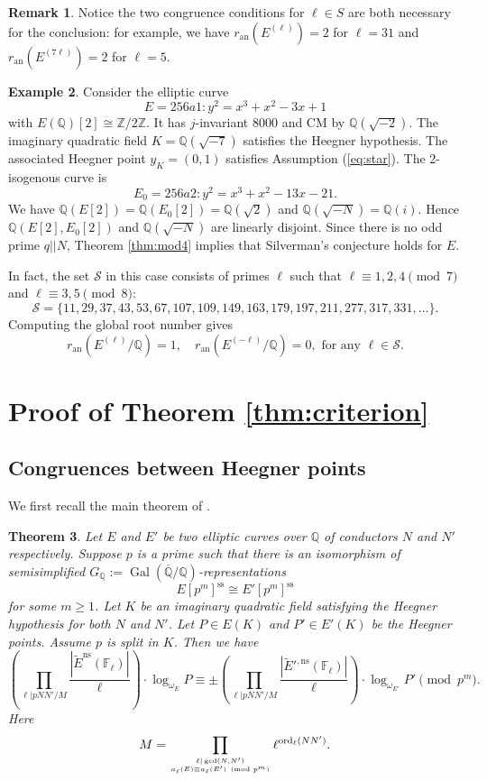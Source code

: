 \documentclass[11pt]{amsart}
\newtheorem{theorem}{Theorem}[section]
\theoremstyle{definition}
\newtheorem{remark}[theorem]{Remark}
\newtheorem{example}[theorem]{Example}
\DeclareMathOperator{\ord}{ord}
\DeclareMathOperator{\Gal}{Gal}
\begin{document}
\begin{remark}
  Notice the two congruence conditions for $\ell\in S$ are both necessary for the conclusion: for example, we have $r_\mathrm{an}(E^{(\ell)})=2$ for $\ell=31$ and $r_\mathrm{an}(E^{(7 \ell)})=2$ for $\ell=5$.
\end{remark}

\begin{example}
  Consider the elliptic curve $$E=256a1: y^2=x^3+x^2-3x+1$$ with $E(\mathbb{Q})[2]\cong \mathbb{Z}/2 \mathbb{Z}$. It has $j$-invariant 8000 and CM by $\mathbb{Q}(\sqrt{-2})$. The imaginary quadratic field $K=\mathbb{Q} (\sqrt{-7})$ satisfies the Heegner hypothesis. The associated Heegner point $y_K=(0,1)$ satisfies Assumption (\ref{eq:star}). The 2-isogenous curve is $$E_0=256a2: y^2=x^3+x^2-13x-21.$$ We have $\mathbb{Q}(E[2])=\mathbb{Q}(E_0[2])=\mathbb{Q}(\sqrt{2})$ and $\mathbb{Q}(\sqrt{-N})=\mathbb{Q}(i)$. Hence $\mathbb{Q}(E[2], E_0[2])$ and $\mathbb{Q}(\sqrt{-N})$ are linearly disjoint. Since there is no odd prime $q||N$, Theorem \ref{thm:mod4} implies that Silverman's conjecture holds for $E$.


  In fact, the set $\mathcal{S}$ in this case consists of primes $\ell$ such that $\ell\equiv1,2,4\pmod{7}$ and $\ell\equiv3,5\pmod{8}$: $$\mathcal{S}=\{11,
 29,
 37,
 43,
 53,
 67,
 107,
 109,
 149,
 163,
 179,
 197,
 211,
 277,
 317,
 331,\ldots\}.$$ Computing the global root number gives $$r_\mathrm{an}(E^{(\ell)}/\mathbb{Q})=1, \quad r_\mathrm{an}(E^{(-\ell)}/\mathbb{Q})=0,\text{ for any }\ell\in \mathcal{S}.$$
\end{example}

\section{Proof of Theorem \ref{thm:criterion}}


\subsection{Congruences between Heegner points}\label{sec:congr-betw-heegn} We first recall the main theorem of \cite{KrizLi2016a}. 
\begin{theorem}\label{thm:maincongruence} Let $E$ and $E'$ be two elliptic curves over $\mathbb{Q}$ of conductors $N$ and $N'$ respectively. Suppose $p$ is a prime such that there is an isomorphism of semisimplified  $G_\mathbb{Q}:=\Gal(\overline{\mathbb{Q}}/\mathbb{Q})$-representations $$E[p^m]^{\mathrm{ss}} \cong E'[p^m]^{\mathrm{ss}}$$ for some $m\ge1$. Let $K$ be an imaginary quadratic field satisfying the Heegner hypothesis for both $N$ and $N'$. Let $P \in E(K)$ and $P' \in E'(K)$ be the Heegner points. Assume $p$ is split in $K$. Then we have
$$\left(\prod_{\ell|pNN'/M}\frac{|\tilde{E}^{\mathrm{ns}}(\mathbb{F}_{\ell})|}{\ell}\right)\cdot \log_{\omega_E}P \equiv \pm\left(\prod_{\ell|pNN'/M}\frac{|\tilde{E}'^{,\mathrm{ns}}(\mathbb{F}_{\ell})|}{\ell}\right)\cdot\log_{\omega_{E'}}P' \pmod {p^m}.$$ Here 
$$M = \prod_{\ell|\gcd(N,N') \atop a_{\ell}(E)\equiv a_{\ell}(E')\pmod{p^m}}\ell^{\ord_{\ell}(NN')}.$$
\end{theorem}
\end{document}
